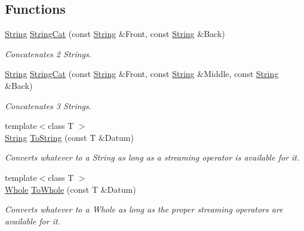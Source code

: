 \subsection*{Functions}
\begin{DoxyCompactItemize}
\item 
\hyperlink{namespacephys_aa03900411993de7fbfec4789bc1d392e}{String} \hyperlink{namespacephys_a7b6390aedd6532260accd12e829bf654}{StringCat} (const \hyperlink{namespacephys_aa03900411993de7fbfec4789bc1d392e}{String} \&Front, const \hyperlink{namespacephys_aa03900411993de7fbfec4789bc1d392e}{String} \&Back)
\begin{DoxyCompactList}\small\item\em Concatenates 2 Strings. \item\end{DoxyCompactList}\item 
\hyperlink{namespacephys_aa03900411993de7fbfec4789bc1d392e}{String} \hyperlink{namespacephys_a2acc1c7ec01ac009cfe227d418da4b8b}{StringCat} (const \hyperlink{namespacephys_aa03900411993de7fbfec4789bc1d392e}{String} \&Front, const \hyperlink{namespacephys_aa03900411993de7fbfec4789bc1d392e}{String} \&Middle, const \hyperlink{namespacephys_aa03900411993de7fbfec4789bc1d392e}{String} \&Back)
\begin{DoxyCompactList}\small\item\em Concatenates 3 Strings. \item\end{DoxyCompactList}\item 
{\footnotesize template$<$class T $>$ }\\\hyperlink{namespacephys_aa03900411993de7fbfec4789bc1d392e}{String} \hyperlink{namespacephys_ae81e34843c6c569026b9a7d9d54c4f04}{ToString} (const T \&Datum)
\begin{DoxyCompactList}\small\item\em Converts whatever to a String as long as a streaming operator is available for it. \item\end{DoxyCompactList}\item 
{\footnotesize template$<$class T $>$ }\\\hyperlink{namespacephys_a460f6bc24c8dd347b05e0366ae34f34a}{Whole} \hyperlink{namespacephys_a53d44a46cab542ef86a541af5f1a7b62}{ToWhole} (const T \&Datum)
\begin{DoxyCompactList}\small\item\em Converts whatever to a Whole as long as the proper streaming operators are available for it. \item\end{DoxyCompactList}\item 

\end{DoxyCompactItemize}
